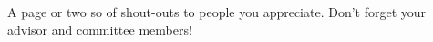 \acknowledgment

A page or two so of shout-outs to people you appreciate.  Don't forget
your advisor and committee members!

